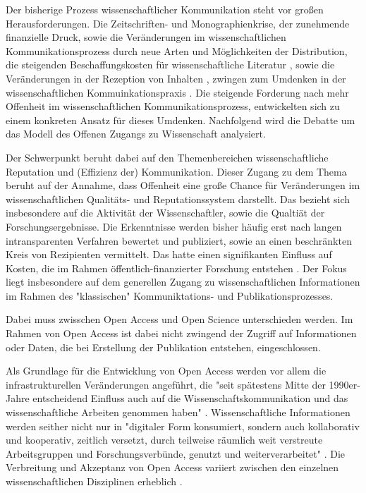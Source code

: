 Der bisherige Prozess wissenschaftlicher Kommunikation steht vor großen Herausforderungen. Die Zeitschriften- und Monographienkrise, der zunehmende finanzielle Druck, sowie die Veränderungen im wissenschaftlichen Kommunikationsprozess durch neue Arten und Möglichkeiten der Distribution, die steigenden Beschaffungskosten für wissenschaftliche Literatur \cite{cite:17} \cite{muller_2010_open}, sowie die Veränderungen in der Rezeption von Inhalten \cite{holub_2013_reception}, zwingen zum Umdenken in der wissenschaftlichen Kommuinkationspraxis \cite{suchen}. Die steigende Forderung nach mehr Offenheit im wissenschaftlichen Kommunikationsprozess, entwickelten sich zu einem konkreten Ansatz für dieses Umdenken. Nachfolgend wird die Debatte um das Modell des Offenen Zugangs zu Wissenschaft analysiert.

Der Schwerpunkt beruht dabei auf den Themenbereichen wissenschaftliche Reputation und (Effizienz der) Kommunikation. Dieser Zugang zu dem Thema beruht auf der Annahme, dass Offenheit eine große Chance für Veränderungen im wissenschaftlichen Qualitäts- und Reputationssystem darstellt. Das bezieht sich insbesondere auf die Aktivität der Wissenschaftler, sowie die Qualtiät der Forschungsergebnisse. Die Erkenntnisse werden bisher häufig erst nach langen intransparenten Verfahren bewertet und publiziert, sowie an einen beschränkten Kreis von Rezipienten vermittelt. Das hatte einen signifikanten Einfluss auf Kosten, die im Rahmen öffentlich-finanzierter Forschung entstehen \cite{suchen}. Der Fokus liegt insbesondere auf dem generellen Zugang zu wissenschaftlichen Informationen im Rahmen des "klassischen" Kommuniktations- und Publikationsprozesses. 

Dabei muss zwisschen Open Access und Open Science unterschieden werden. Im Rahmen von Open Access ist dabei nicht zwingend der Zugriff auf Informationen oder Daten, die bei Erstellung der Publikation entstehen, eingeschlossen. 

Als Grundlage für die Entwicklung von Open Access werden vor allem die infrastrukturellen Veränderungen angeführt, die "seit spätestens Mitte der 1990er-Jahre entscheidend Einfluss auch auf die Wissenschaftskommunikation und das wissenschaftliche Arbeiten genommen haben" \cite{schulze_2013_open}. Wissenschaftliche Informationen werden seither nicht nur in "digitaler Form konsumiert, sondern auch kollaborativ und kooperativ, zeitlich versetzt, durch teilweise räumlich weit verstreute Arbeitsgruppen und Forschungsverbünde, genutzt und weiterverarbeitet" \cite{schulze_2013_open}. Die Verbreitung und Akzeptanz von Open Access variiert zwischen den einzelnen wissenschaftlichen Disziplinen erheblich \cite{cite:21a}.

